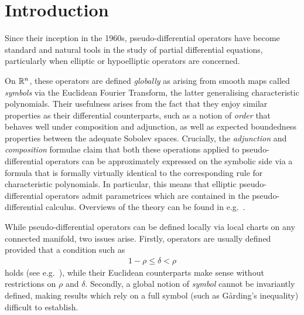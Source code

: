 \chapter{Introduction}

Since their inception in the 1960s,
pseudo-differential operators have become standard and natural tools in the study of partial differential equations,
particularly when elliptic or hypoelliptic operators are concerned.

On $\mathbb{R}^n$,
these operators are defined \emph{globally} as arising from smooth maps called \emph{symbols} via the Euclidean Fourier Transform,
the latter generalising characteristic polynomials.
Their usefulness arises from the fact that they enjoy similar properties as their differential counterparts,
such as a notion of \emph{order} that behaves well under composition and adjunction,
as well as expected boundedness properties between the adequate Sobolev spaces.
Crucially,
the \emph{adjunction} and \emph{composition} formulae claim that
both these operations applied to pseudo-differential operators can be approximately expressed on the symbolic side via a formula that is formally virtually identical to the corresponding rule for characteristic polynomials.
In particular,
this means that elliptic pseudo-differential operators admit parametrices which are contained in the pseudo-differential calculus.
Overviews of the theory can be found in e.g.~\cite{Shubin01,Hormander07}.

While pseudo-differential operators can be defined locally via local charts on any connected manifold,
two issues arise.
Firstly,
operators are usually defined provided that a condition such as
\begin{align*}
    1 - \rho \leq \delta < \rho
\end{align*}
holds (see e.g.~\cite[Section 4]{Shubin01}),
while their Euclidean counterparts make sense without restrictions on $\rho$ and $\delta$.
Secondly,
a global notion of \emph{symbol} cannot be invariantly defined,
making results which rely on a full symbol (such as Gårding's inequality) difficult to establish.

